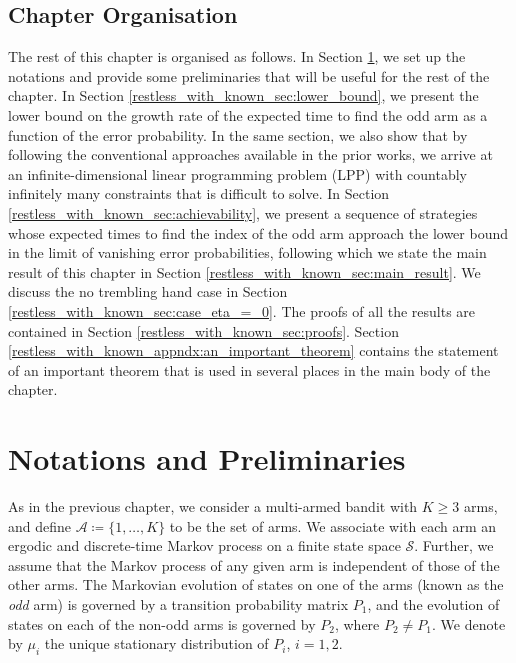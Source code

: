 \subsection{Chapter Organisation}
The rest of this chapter is organised as follows. In Section \ref{restless_with_known_sec:notations}, we set up the notations and provide some preliminaries that will be useful for the rest of the chapter. 
In Section \ref{restless_with_known_sec:lower_bound}, we present the lower bound on {\color{black} the growth rate of} the expected time to find the odd arm as a function of the error probability. In the same section, we also show that by following the conventional approaches available in the prior works, we arrive at an infinite-dimensional linear programming problem (LPP) with countably infinitely many constraints that is difficult to solve. In Section \ref{restless_with_known_sec:achievability}, we present a sequence of strategies whose expected times to find the index of the odd arm approach the lower bound in the limit of vanishing error probabilities, following which we state the main result of this chapter in Section \ref{restless_with_known_sec:main_result}. We discuss the no trembling hand case in Section \ref{restless_with_known_sec:case_eta_=_0}. 
The proofs of all the results are contained in Section \ref{restless_with_known_sec:proofs}. Section \ref{restless_with_known_appndx:an_important_theorem} contains the statement of an important theorem that is used in several places in the main body of the chapter.

\section{Notations and Preliminaries}
\label{restless_with_known_sec:notations}
As in the previous chapter, we consider a multi-armed bandit with $K\geq 3$ arms, and define $\mathcal{A}\coloneqq \{1,\ldots,K\}$ to be the set of arms. We associate with each arm an ergodic and discrete-time Markov process on a finite state space $\mathcal{S}$. Further, we assume that the Markov process of any given arm is independent of those of the other arms. The Markovian evolution of states on one of the arms (known as the \emph{odd} arm) is governed by a transition probability matrix $P_1$, and the evolution of states on each of the non-odd arms is governed by $P_2$, where $P_2\neq P_1$. We denote by $\mu_i$ the unique stationary distribution of $P_i$, $i=1,2$.

